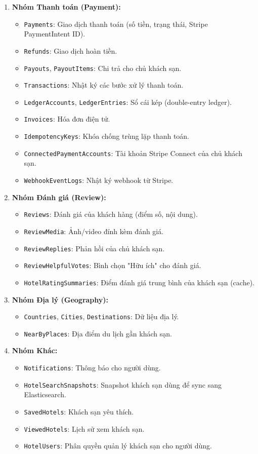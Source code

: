 \documentclass[13pt,a4paper,twoside]{report}
\begin{document}
\begin{enumerate}
  \item \textbf{Nhóm Thanh toán (Payment):}
  \begin{itemize}
    \item \texttt{Payments}: Giao dịch thanh toán (số tiền, trạng thái, Stripe PaymentIntent ID).
    \item \texttt{Refunds}: Giao dịch hoàn tiền.
    \item \texttt{Payouts}, \texttt{PayoutItems}: Chi trả cho chủ khách sạn.
    \item \texttt{Transactions}: Nhật ký các bước xử lý thanh toán.
    \item \texttt{LedgerAccounts}, \texttt{LedgerEntries}: Sổ cái kép (double-entry ledger).
    \item \texttt{Invoices}: Hóa đơn điện tử.
    \item \texttt{IdempotencyKeys}: Khóa chống trùng lặp thanh toán.
    \item \texttt{ConnectedPaymentAccounts}: Tài khoản Stripe Connect của chủ khách sạn.
    \item \texttt{WebhookEventLogs}: Nhật ký webhook từ Stripe.
  \end{itemize}

  \item \textbf{Nhóm Đánh giá (Review):}
  \begin{itemize}
    \item \texttt{Reviews}: Đánh giá của khách hàng (điểm số, nội dung).
    \item \texttt{ReviewMedia}: Ảnh/video đính kèm đánh giá.
    \item \texttt{ReviewReplies}: Phản hồi của chủ khách sạn.
    \item \texttt{ReviewHelpfulVotes}: Bình chọn "Hữu ích" cho đánh giá.
    \item \texttt{HotelRatingSummaries}: Điểm đánh giá trung bình của khách sạn (cache).
  \end{itemize}

  \item \textbf{Nhóm Địa lý (Geography):}
  \begin{itemize}
    \item \texttt{Countries}, \texttt{Cities}, \texttt{Destinations}: Dữ liệu địa lý.
    \item \texttt{NearByPlaces}: Địa điểm du lịch gần khách sạn.
  \end{itemize}

  \item \textbf{Nhóm Khác:}
  \begin{itemize}
    \item \texttt{Notifications}: Thông báo cho người dùng.
    \item \texttt{HotelSearchSnapshots}: Snapshot khách sạn dùng để sync sang Elasticsearch.
    \item \texttt{SavedHotels}: Khách sạn yêu thích.
    \item \texttt{ViewedHotels}: Lịch sử xem khách sạn.
    \item \texttt{HotelUsers}: Phân quyền quản lý khách sạn cho người dùng.
  \end{itemize}
\end{enumerate}
\end{document}
